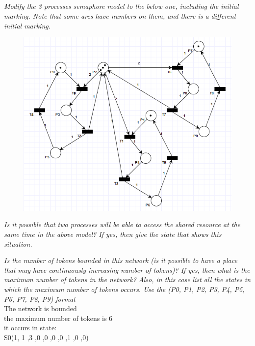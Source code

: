 \documentclass[letterpaper]{article}
\begin{document}
\subsection{}
\textit{Modify the 3 processes semaphore model to the below one, including the initial marking.
 Note that some arcs have numbers on them, and there is a different initial marking.
}

\begin{figure}[H]
 \centering
 \includegraphics[width=\textwidth]{image5.png}
\end{figure}

\textit{Is it possible that two processes will be able to access the shared resource at the same time in the above model? If yes, then give the state that shows this situation.}


\vspace{2cm}
\textit{Is the number of tokens bounded in this network (is it possible to have a place that may have continuously increasing number of tokens)? If yes, then what is the maximum number of tokens in the network? Also, in this case list all the states in which the maximum number of tokens occurs.
 Use the (P0, P1, P2, P3, P4, P5, P6, P7, P8, P9) format
}\\

The network is bounded\\
the maximum number of tokens is 6\\
it occurs in state:\\
S0(1, 1 ,3 ,0 ,0 ,0 ,0 ,1 ,0 ,0)
\end{document}
